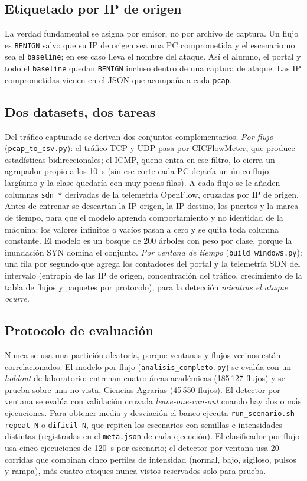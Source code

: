 \documentclass[a4paper,fleqn]{cas-dc}
\begin{document}
\subsection{Etiquetado por IP de origen}
La verdad fundamental se asigna por emisor, no por archivo de captura. Un flujo es \texttt{BENIGN} salvo que su IP de origen sea una PC comprometida y el escenario no sea el \texttt{baseline}; en ese caso lleva el nombre del ataque. Así el alumno, el portal y todo el \texttt{baseline} quedan \texttt{BENIGN} incluso dentro de una captura de ataque. Las IP comprometidas vienen en el JSON que acompa\~na a cada \texttt{pcap}.

\subsection{Dos datasets, dos tareas}
Del tráfico capturado se derivan dos conjuntos complementarios. \emph{Por flujo} (\texttt{pcap\_to\_csv.py}): el tráfico TCP y UDP pasa por CICFlowMeter, que produce estadísticas bidireccionales; el ICMP, queno entra en ese filtro, lo cierra un agrupador propio a los 10~s (sin ese corte cada PC dejaría un único flujo largísimo y la clase quedaría con muy pocas filas). A cada flujo se le a\~naden columnas \texttt{sdn\_*} derivadas de la telemetría OpenFlow, cruzadas por IP de origen. Antes de entrenar se descartan la IP origen, la IP destino, los puertos y la marca de tiempo, para que el modelo aprenda comportamiento y no identidad de la máquina; los valores infinitos o vacíos pasan a cero y se quita toda columna constante. El modelo es un bosque de 200 árboles con peso por clase, porque la inundación SYN domina el conjunto. \emph{Por ventana de tiempo} (\texttt{build\_windows.py}): una fila por segundo que agrega los contadores del portal y la telemetría SDN del intervalo (entropía de las IP de origen, concentración del tráfico, crecimiento de la tabla de flujos y paquetes por protocolo), para la detección \emph{mientras el ataque ocurre}.

\subsection{Protocolo de evaluación}
Nunca se usa una partición aleatoria, porque ventanas y flujos vecinos están correlacionados. El modelo por flujo (\texttt{analisis\_completo.py}) se evalúa con un \emph{holdout} de laboratorio: entrenan cuatro áreas académicas (185\,127 flujos) y se prueba sobre una no vista, Ciencias Agrarias (45\,550 flujos). El detector por ventana se evalúa con validación cruzada \emph{leave-one-run-out} cuando hay dos o más ejecuciones. Para obtener media y desviación el banco ejecuta \texttt{run\_scenario.sh repeat N} o \texttt{dificil N}, que repiten los escenarios con semillas e intensidades distintas (registradas en el \texttt{meta.json} de cada ejecución). El clasificador por flujo usa cinco ejecuciones de 120~s por escenario; el detector por ventana usa 20 corridas que combinan cinco perfiles de intensidad (normal, bajo, sigiloso, pulsos y rampa), más cuatro ataques nunca vistos reservados solo para prueba.
\end{document}

